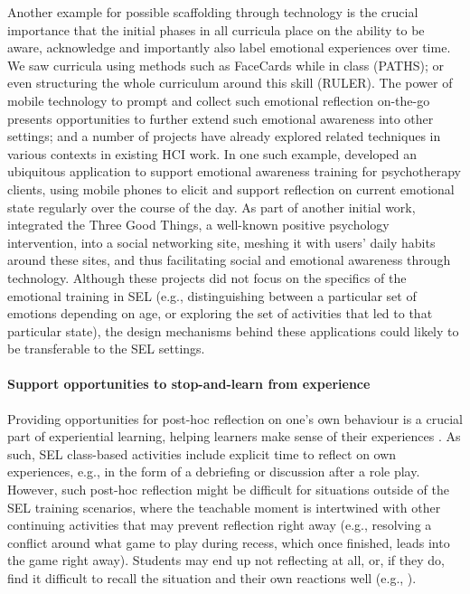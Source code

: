 \documentclass[prodmode,acmtochi]{acmsmall}
\begin{document}
Another example for possible scaffolding through technology is the crucial importance that the initial phases in all curricula place on the ability to be aware, acknowledge and importantly also label emotional experiences over time. We saw curricula using methods such as FaceCards while in class (PATHS); or even structuring the whole curriculum around this skill (RULER). The power of mobile technology to prompt and collect such emotional reflection on-the-go presents opportunities to further extend such emotional awareness into other settings; and a number of projects have already explored related techniques in various contexts in existing HCI work. In one such example,  developed an ubiquitous application to support emotional awareness training  for psychotherapy clients, using mobile phones to elicit and support reflection on current emotional state regularly over the course of the day. As part of another initial work,  integrated the Three Good Things, a well-known positive psychology intervention, into a social networking site, meshing it with users' daily habits around these sites, and thus facilitating social and emotional awareness through technology. 
%
Although these projects did not focus on the specifics of the emotional training in SEL (e.g., distinguishing between a particular set of emotions depending on age, or exploring the set of activities that led to that particular state), the design mechanisms behind these applications could likely to be transferable to the SEL settings. 

\paragraph{Support opportunities to stop-and-learn from experience}
Providing opportunities for post-hoc reflection on one's own behaviour is a crucial part of experiential learning, helping learners make sense of their experiences
 \cite{Moon1999,Cohen2001}. As such, SEL class-based activities include explicit time to reflect on own experiences, e.g., in the form of a debriefing or discussion after a role play. However, such post-hoc reflection might be difficult for situations outside of the SEL training scenarios, where the teachable moment is intertwined with other continuing activities that may prevent reflection right away (e.g., resolving a conflict around what game to play during recess, which once finished, leads into the game right away). Students may end up not reflecting at all, or, if they do, find it difficult to recall the situation and their own reactions well (e.g., \cite[p. 55]{Pasi2001}).
\end{document}
